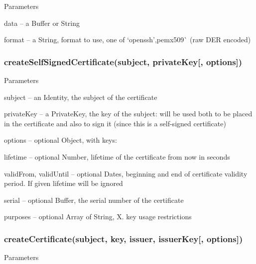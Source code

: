 Parameters


\begin{DoxyItemize}
\item {\ttfamily data} -- a Buffer or String
\item {\ttfamily format} -- a String, format to use, one of `\textquotesingle{}openssh'{\ttfamily ,}\textquotesingle{}pem\textquotesingle{}x509\textquotesingle{}\`{} (raw D\+ER encoded)
\end{DoxyItemize}

\subsubsection*{{\ttfamily create\+Self\+Signed\+Certificate(subject, private\+Key\mbox{[}, options\mbox{]})}}

Parameters


\begin{DoxyItemize}
\item {\ttfamily subject} -- an Identity, the subject of the certificate
\item {\ttfamily private\+Key} -- a Private\+Key, the key of the subject\+: will be used both to be placed in the certificate and also to sign it (since this is a self-\/signed certificate)
\item {\ttfamily options} -- optional Object, with keys\+:
\begin{DoxyItemize}
\item {\ttfamily lifetime} -- optional Number, lifetime of the certificate from now in seconds
\item {\ttfamily valid\+From}, {\ttfamily valid\+Until} -- optional Dates, beginning and end of certificate validity period. If given {\ttfamily lifetime} will be ignored
\item {\ttfamily serial} -- optional Buffer, the serial number of the certificate
\item {\ttfamily purposes} -- optional Array of String, X. key usage restrictions
\end{DoxyItemize}
\end{DoxyItemize}

\subsubsection*{{\ttfamily create\+Certificate(subject, key, issuer, issuer\+Key\mbox{[}, options\mbox{]})}}

Parameters



